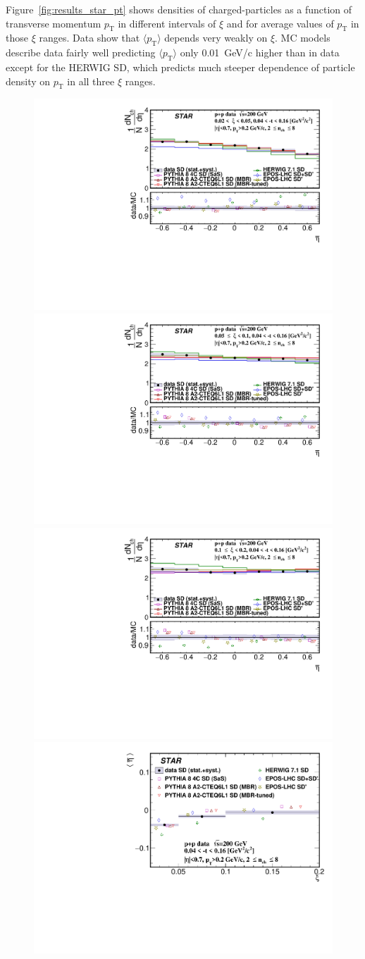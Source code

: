 Figure~\ref{fig:results_star_pt} shows densities of charged-particles as a function of transverse momentum  $p_\textrm{T}$ in different intervals of $\xi$ and for average values of  $p_\textrm{T}$ in those $\xi$ ranges.
Data show that $\langle p_\textrm{T}\rangle$ depends very weakly on $\xi$. MC models describe data fairly well predicting $\langle p_\textrm{T}\rangle$ only 0.01~GeV/c higher than in data except for the HERWIG SD, which predicts much steeper dependence of particle density on  $p_\textrm{T}$ in all three $\xi$ ranges.


\begin{figure}[t!]
	\centering
	\includegraphics[width=.49\textwidth,page=1]{chapters/chrgSTAR/img/results/out_eta_SD_0.pdf}
	\hfill
	\includegraphics[width=.49\textwidth,page=1]{chapters/chrgSTAR/img/results/out_eta_SD_1.pdf}
	\newline
	\includegraphics[width=.49\textwidth,page=1]{chapters/chrgSTAR/img/results/out_eta_SD_2.pdf}
	\hfill
	\includegraphics[width=.49\textwidth,page=1]{chapters/chrgSTAR/img/results/mean_eta_xi.pdf}

\end{figure}

